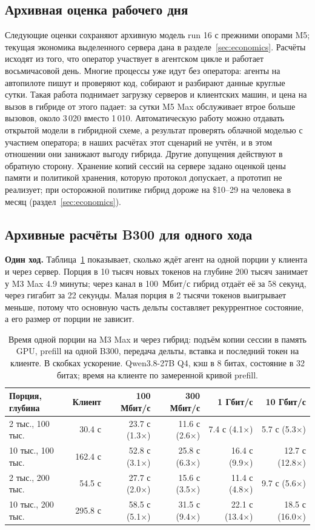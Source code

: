 \subsection{Архивная оценка рабочего дня}
Следующие оценки сохраняют архивную модель run 16 с прежними опорами M5; текущая экономика выделенного сервера дана в разделе~\ref{sec:economics}. Расчёты исходят из того, что оператор участвует в агентском цикле и работает восьмичасовой день. Многие процессы
уже идут без оператора: агенты на автопилоте пишут и проверяют код, собирают и разбирают данные круглые сутки. Такая работа поднимает
загрузку серверов и клиентских машин, и цена на вызов в гибриде от этого падает: за сутки M5 Max обслуживает втрое
больше вызовов, около 3\,020 вместо 1\,010. Автоматическую работу можно
отдавать открытой модели в гибридной схеме, а результат проверять облачной моделью с участием оператора; в наших расчётах этот сценарий не учтён, и в этом отношении они занижают выгоду гибрида. Другие допущения действуют
в обратную сторону. Хранение копий сессий на сервере задано оценкой цены памяти и политикой хранения, которую протокол
допускает, а прототип не реализует; при осторожной политике гибрид дороже на \$10--29 на человека в месяц
(раздел~\ref{sec:economics}).

\subsection{Архивные расчёты B300 для одного хода}
\label{app:channel-model-history}

\textbf{Один ход.} Таблица~\ref{tab:turn} показывает, сколько ждёт агент на одной порции у клиента и через сервер.
Порция в 10 тысяч новых токенов на глубине 200 тысяч занимает у M3 Max 4.9 минуты; через канал в 100~Мбит/с гибрид
отдаёт её за 58 секунд, через гигабит за 22 секунды. Малая порция в 2 тысячи токенов выигрывает меньше, потому что
основную часть дельты составляет рекуррентное состояние, а его размер от порции не зависит.

\begin{table}[t]
\centering
\caption{Время одной порции на M3 Max и через гибрид: подъём копии сессии в память GPU, prefill на одной B300,
передача дельты, вставка и последний токен на клиенте. В скобках ускорение. Qwen3.8-27B Q4, кэш в 8 битах, состояние в 32 битах; время на клиенте по замеренной
кривой prefill.}
\label{tab:turn}
\footnotesize
\begin{tabular}{lrrrrr}
\toprule
Порция, глубина & Клиент & 100 Мбит/с & 300 Мбит/с & 1 Гбит/с & 10 Гбит/с \\
\midrule
2 тыс., 100 тыс. & 30.4 с & 23.7 с (1.3×) & 11.6 с (2.6×) & 7.4 с (4.1×) & 5.7 с (5.3×) \\
10 тыс., 100 тыс. & 162.4 с & 52.8 с (3.1×) & 25.8 с (6.3×) & 16.4 с (9.9×) & 12.7 с (12.8×) \\
2 тыс., 200 тыс. & 54.5 с & 27.7 с (2.0×) & 15.6 с (3.5×) & 11.4 с (4.8×) & 9.7 с (5.6×) \\
10 тыс., 200 тыс. & 295.8 с & 58.5 с (5.1×) & 31.5 с (9.4×) & 22.1 с (13.4×) & 18.5 с (16.0×) \\
\bottomrule
\end{tabular}
\end{table}

